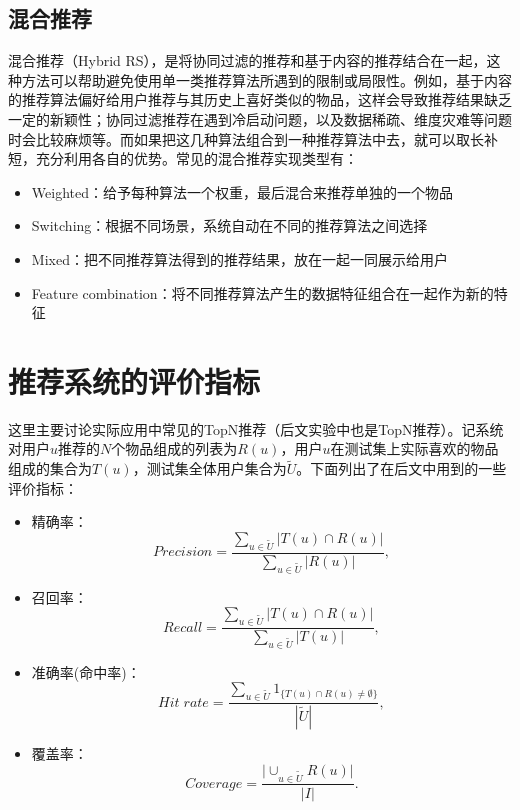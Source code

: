     \subsection{混合推荐}
    混合推荐（Hybrid RS），是将协同过滤的推荐和基于内容的推荐结合在一起，这种方法可以帮助避免使用单一类推荐算法所遇到的限制或局限性。例如，基于内容的推荐算法偏好给用户推荐与其历史上喜好类似的物品，这样会导致推荐结果缺乏一定的新颖性；协同过滤推荐在遇到冷启动问题，以及数据稀疏、维度灾难等问题时会比较麻烦等。而如果把这几种算法组合到一种推荐算法中去，就可以取长补短，充分利用各自的优势。常见的混合推荐实现类型有\cite{burke2002hybrid}：
    \begin{itemize}
      \item Weighted：给予每种算法一个权重，最后混合来推荐单独的一个物品
      \item Switching：根据不同场景，系统自动在不同的推荐算法之间选择
      \item Mixed：把不同推荐算法得到的推荐结果，放在一起一同展示给用户
      \item Feature combination：将不同推荐算法产生的数据特征组合在一起作为新的特征
    \end{itemize}

  \section{推荐系统的评价指标}
  这里主要讨论实际应用中常见的TopN推荐（后文实验中也是TopN推荐）。记系统对用户$u$推荐的$N$个物品组成的列表为$R(u)$，用户$u$在测试集上实际喜欢的物品组成的集合为$T(u)$，测试集全体用户集合为$\tilde{U}$。下面列出了在后文中用到的一些评价指标\cite{2012推荐系统实践}：
  \begin{itemize}
    \item 精确率：
    \begin{equation}
    Precision = \frac{\sum\limits_{u\in\tilde{U}}|T(u)\cap R(u)|}{\sum\limits_{u\in\tilde{U}}|R(u)|},
    \end{equation}
    
    \item 召回率：
    \begin{equation}
    Recall = \frac{\sum\limits_{u\in\tilde{U}}|T(u)\cap R(u)|}{\sum\limits_{u\in\tilde{U}}|T(u)|},
    \end{equation}

    \item 准确率(命中率)：
    \begin{equation}
    Hit\;rate=\frac{\sum\limits_{u\in\tilde{U}}1_{\{T(u)\cap R(u) \neq\emptyset\}}}{|\tilde{U}|},
    \end{equation}

    \item 覆盖率：
    \begin{equation}
    Coverage = \frac{\big|\cup_{u\in\tilde{U}}R(u)\big|}{|I|}.
    \end{equation}
    
  \end{itemize}

